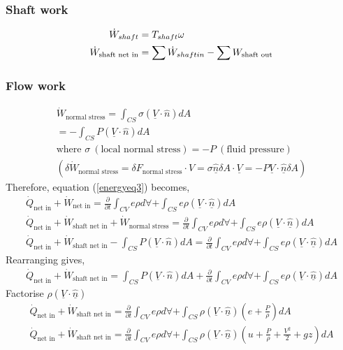 \subsubsection{Shaft work}
\begin{align}
  \dot{W}_{shaft}                 & = T_{shaft} \omega                                           \\
  \dot{W}_{\textrm{shaft net in}} & = \sum \dot{W}_{shaft in} - \sum \do{W}_{\textrm{shaft out}}
\end{align}
\subsubsection{Flow work}
\begin{gather}
  \dot{W}_{\textrm{normal stress}} = \int_{CS} \sigma (\underline{V}\cdot \hat{n}) dA\\
  = - \int_{CS} P (\underline{V}\cdot \hat{n}) dA\\
  \textrm{where } \sigma \ (\textrm{local normal stress}) = - P \ (\textrm{fluid pressure})\\
  (\delta \dot{W}_{\textrm{normal stress}} = \delta F_{\textrm{normal stress}} \cdot V = \sigma \underline{\hat{n}} \delta A \cdot \underline{V} = -P\underline{V} \cdot \underline{\hat{n}} \delta A )
\end{gather}
Therefore, equation (\ref{energyeq3}) becomes,
\begin{gather}
  \dot{Q}_{\textrm{net in}} + \dot{W}_{\textrm{net in}} = \frac{\partial}{\partial t} \int_{CV} e \rho d \forall + \int_{CS} e \rho (\underline{V} \cdot \underline{\hat{n}}) dA\\
  \dot{Q}_{\textrm{net in}} + \dot{W}_{\textrm{shaft net in}} + \dot{W}_{\textrm{normal stress}} = \frac{\partial}{\partial t} \int_{CV} e \rho d \forall + \int_{CS} e \rho (\underline{V} \cdot \underline{\hat{n}}) dA\\
  \dot{Q}_{\textrm{net in}} + \dot{W}_{\textrm{shaft net in}} - \int_{CS} P (\underline{V}\cdot \hat{n}) dA = \frac{\partial}{\partial t} \int_{CV} e \rho d \forall + \int_{CS} e \rho (\underline{V} \cdot \underline{\hat{n}}) dA
\end{gather}
Rearranging gives,
\begin{gather}
  \dot{Q}_{\textrm{net in}} + \dot{W}_{\textrm{shaft net in}} = \int_{CS} P (\underline{V}\cdot \hat{n}) dA + \frac{\partial}{\partial t} \int_{CV} e \rho d \forall + \int_{CS} e \rho (\underline{V} \cdot \underline{\hat{n}}) dA
\end{gather}
Factorise $\rho (\underline{V}\cdot \underline{\hat{n}})$
\begin{gather}
  \dot{Q}_{\textrm{net in}} + \dot{W}_{\textrm{shaft net in}} = \frac{\partial}{\partial t} \int_{CV} e \rho d \forall + \int_{CS} \rho (\underline{V} \cdot \underline{\hat{n}})(e + \frac{P}{\rho}) dA\\
  \dot{Q}_{\textrm{net in}} + \dot{W}_{\textrm{shaft net in}} = \frac{\partial}{\partial t} \int_{CV} e \rho d \forall + \int_{CS} \rho (\underline{V} \cdot \underline{\hat{n}})(u + \frac{P}{\rho} + \frac{V^2}{2} + gz) dA
\end{gather}

